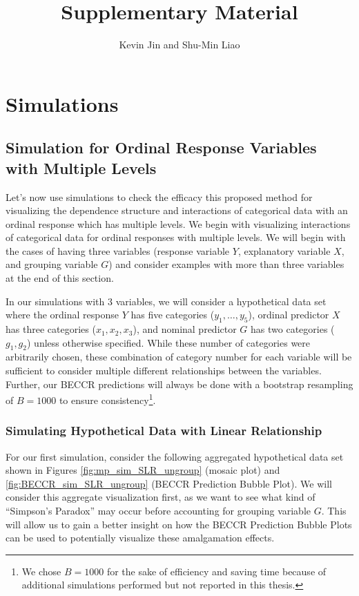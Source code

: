 \documentclass[
]{article}
\title{Supplementary Material}
\author{Kevin Jin and Shu-Min Liao}
\date{}
\begin{document}
\maketitle

\section{Simulations}\label{simulations}

\subsection{Simulation for Ordinal Response Variables with Multiple
Levels}\label{simulation-for-ordinal-response-variables-with-multiple-levels}

Let's now use simulations to check the efficacy this proposed method for
visualizing the dependence structure and interactions of categorical
data with an ordinal response which has multiple levels. We begin with
visualizing interactions of categorical data for ordinal responses with
multiple levels. We will begin with the cases of having three variables
(response variable \(Y\), explanatory variable \(X\), and grouping
variable \(G\)) and consider examples with more than three variables at
the end of this section.

In our simulations with 3 variables, we will consider a hypothetical
data set where the ordinal response \(Y\) has five categories
(\(y_1,\dots,y_5\)), ordinal predictor \(X\) has three categories
(\(x_1,x_2,x_3\)), and nominal predictor \(G\) has two categories
(\(g_1, g_2\)) unless otherwise specified. While these number of
categories were arbitrarily chosen, these combination of category number
for each variable will be sufficient to consider multiple different
relationships between the variables. Further, our BECCR predictions will
always be done with a bootstrap resampling of \(B=1000\) to ensure
consistency\footnote{We chose \(B=1000\) for the sake of efficiency and
  saving time because of additional simulations performed but not
  reported in this thesis.}.

\subsubsection{Simulating Hypothetical Data with Linear
Relationship}\label{simulating-hypothetical-data-with-linear-relationship}

For our first simulation, consider the following aggregated hypothetical
data set shown in Figures \ref{fig:mp_sim_SLR_ungroup} (mosaic plot) and
\ref{fig:BECCR_sim_SLR_ungroup} (BECCR Prediction Bubble Plot). We will
consider this aggregate visualization first, as we want to see what kind
of ``Simpson's Paradox'' may occur before accounting for grouping
variable \(G\). This will allow us to gain a better insight on how the
BECCR Prediction Bubble Plots can be used to potentially visualize these
amalgamation effects.
\end{document}
